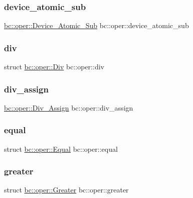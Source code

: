 \subsubsection{\texorpdfstring{device\+\_\+atomic\+\_\+sub}{device\_atomic\_sub}}
{\footnotesize\ttfamily  \hyperlink{structbc_1_1oper_1_1Device__Atomic__Sub}{bc\+::oper\+::\+Device\+\_\+\+Atomic\+\_\+\+Sub}  bc\+::oper\+::device\+\_\+atomic\+\_\+sub}

\mbox{\label{namespacebc_1_1oper_a842fe83591207a9bdccea656eea9c319}} 
\subsubsection{\texorpdfstring{div}{div}}
{\footnotesize\ttfamily struct \hyperlink{structbc_1_1oper_1_1Div}{bc\+::oper\+::\+Div}  bc\+::oper\+::div}

\mbox{\label{namespacebc_1_1oper_a68691708c95bf8edf5b3f36760c7cc7b}} 
\subsubsection{\texorpdfstring{div\+\_\+assign}{div\_assign}}
{\footnotesize\ttfamily  \hyperlink{structbc_1_1oper_1_1Div__Assign}{bc\+::oper\+::\+Div\+\_\+\+Assign}  bc\+::oper\+::div\+\_\+assign}

\mbox{\label{namespacebc_1_1oper_a512ea37049135ce5d4a49c14f8a26b4c}} 
\subsubsection{\texorpdfstring{equal}{equal}}
{\footnotesize\ttfamily struct \hyperlink{structbc_1_1oper_1_1Equal}{bc\+::oper\+::\+Equal}  bc\+::oper\+::equal}

\mbox{\label{namespacebc_1_1oper_ada692f833a60b6e0de8e6e8dc3530eac}} 
\subsubsection{\texorpdfstring{greater}{greater}}
{\footnotesize\ttfamily struct \hyperlink{structbc_1_1oper_1_1Greater}{bc\+::oper\+::\+Greater}  bc\+::oper\+::greater}

